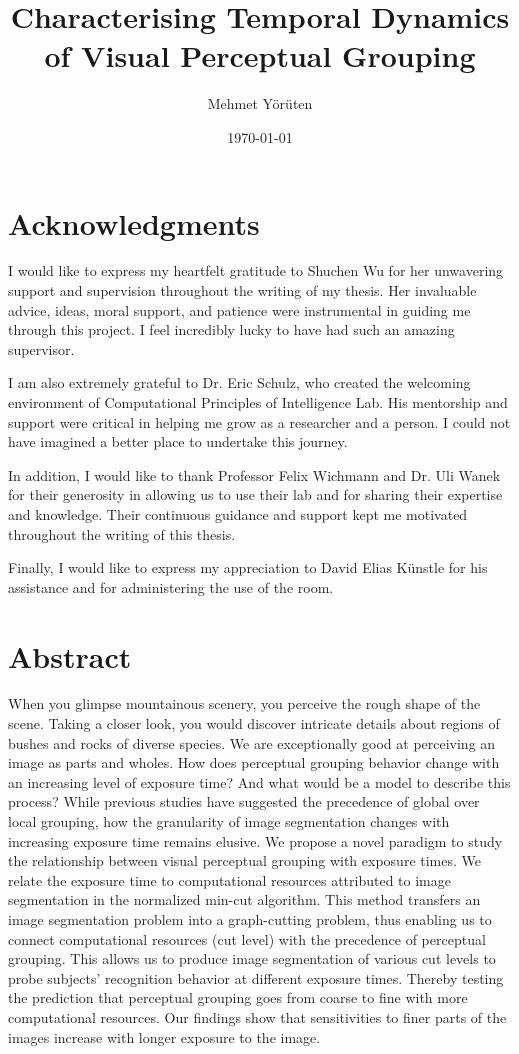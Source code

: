 \documentclass{article}
\title{Characterising Temporal Dynamics of Visual Perceptual Grouping}
\author{Mehmet Yörüten}
\date{\today}
\begin{document}
\clearpage

\section*{Acknowledgments}
I would like to express my heartfelt gratitude to Shuchen Wu for her unwavering support and supervision throughout the writing of my thesis. Her invaluable advice, ideas, moral support, and patience were instrumental in guiding me through this project. I feel incredibly lucky to have had such an amazing supervisor.

I am also extremely grateful to Dr. Eric Schulz, who created the welcoming environment of Computational Principles of Intelligence Lab. His mentorship and support were critical in helping me grow as a researcher and a person. I could not have imagined a better place to undertake this journey.

In addition, I would like to thank Professor Felix Wichmann and Dr. Uli Wanek for their generosity in allowing us to use their lab and for sharing their expertise and knowledge. Their continuous guidance and support kept me motivated throughout the writing of this thesis.

Finally, I would like to express my appreciation to David Elias Künstle for his assistance and for administering the use of the room. 
\clearpage

\section{Abstract}
When you glimpse mountainous scenery, you perceive the rough shape of the scene. Taking a closer look, you would discover intricate details about regions of bushes and rocks of diverse species. We are exceptionally good at perceiving an image as parts and wholes. How does perceptual grouping behavior change with an increasing level of exposure time? And what would be a model to describe this process? While previous studies have suggested the precedence of global over local grouping, how the granularity of image segmentation changes with increasing exposure time remains elusive.
We propose a novel paradigm to study the relationship between visual perceptual grouping with exposure times. We relate the exposure time to computational resources attributed to image segmentation in the normalized min-cut algorithm. This method transfers an image segmentation problem into a graph-cutting problem, thus enabling us to connect computational resources (cut level) with the precedence of perceptual grouping. This allows us to produce image segmentation of various cut levels to probe subjects’ recognition behavior at different exposure times. Thereby testing the prediction that perceptual grouping goes from coarse to fine with more computational resources. Our findings show that sensitivities to finer parts of the images increase with longer exposure to the image.
\end{document}
